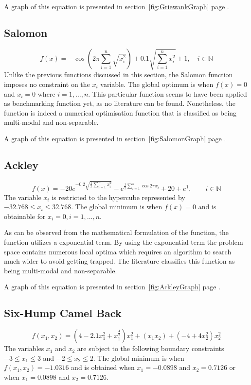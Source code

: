 A graph of this equation is presented in section~\ref{fig:GriewankGraph} page \pageref{fig:GriewankGraph}.
\subsection{Salomon}
\begin{equation}
	f(x) = -\cos{(2\pi\sum_{i=1}^n\sqrt{x_i^2})} + 0.1 \sqrt{\sum_{i=1}^n x_i^2} + 1, \quad i \in \mathbb{N}
\end{equation}
Unlike the previous functions discussed in this section, the Salomon function imposes no constraint on the $x_i$ variable. The global optimum is when $f(x) = 0$ and $x_i = 0$ where $i = 1,\ldots,n$. This particular function seems to have been applied as benchmarking function yet, as no literature can be found. Nonetheless, the function is indeed a numerical optimisation function that is classified as being multi-modal and non-separable\cite{salamonwebsite}.

A graph of this equation is presented in section~\ref{fig:SalomonGraph} page \pageref{fig:SalomonGraph}.
\subsection{Ackley}
\begin{equation}
	f(x) = -20e^{-0.2\sqrt{\frac{1}{2}\sum_{i=1}^n x_i^2}} - e^{\frac{1}{2}\sum_{i=1}^n\cos{2\pi x_i}} + 20 + e^1, \qquad i \in \mathbb{N}
\end{equation}
The variable $x_i$ is restricted to the hypercube represented by $-32.768 \leq x_i \leq 32.768$\cite{numericalABC,ABCCompareStudy,ARPSO,TestFunctions}. The global minimum is when $f(x) = 0$ and is obtainable for $x_i = 0, i = 1,\ldots,n$\cite{numericalABC,ABCCompareStudy,ARPSO,TestFunctions}.

As can be observed from the mathematical formulation of the function, the function utilizes a exponential term. By using the exponential term the problem space contains numerous local optima which requires an algorithm to search much wider to avoid getting trapped. The literature classifies this function as being multi-modal and non-separable\cite{adaptPSO,ABCCompareStudy,numericalABC,TestFunctions}.

A graph of this equation is presented in section~\ref{fig:AckleyGraph} page \pageref{fig:AckleyGraph}.
\subsection{Six-Hump Camel Back}
\begin{equation}
	f(x_1,x_2) = (4 - 2.1x_1^2 + x_1^{\frac{4}{3}})x_1^2 + (x_1x_2) + (-4 + 4x_2^2)x_2^2
\end{equation}
The variables $x_1$ and $x_2$ are subject to the following boundary constraints $-3 \leq x_1 \leq 3$ and $-2 \leq x_2 \leq 2$\cite{DistributedHierarchicalGA,TestFunctions}. The global minimum is when $f(x_1,x_2) = -1.0316$ and is obtained when $x_1 = -0.0898$ and $x_2 = 0.7126$ or when  $x_1 = 0.0898$ and $x_2 = 0.7126$\cite{DistributedHierarchicalGA,TestFunctions}. 

